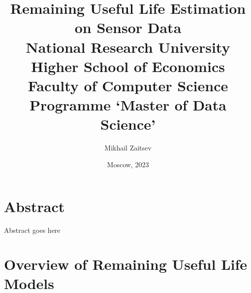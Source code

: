 \documentclass[12pt,a4paper]{report}
\begin{document}
\title{
{Remaining Useful Life Estimation on Sensor Data}\\
{\large National Research University Higher School of Economics}\\
{\large Faculty of Computer Science}\\
{\large Programme ‘Master of Data Science’}\\
}
\author{Mikhail Zaitsev}
\date{Moscow, 2023}
\maketitle


\chapter*{Abstract}
Abstract goes here
\tableofcontents

\chapter{Overview of Remaining Useful Life Models}

\printbibliography[
heading=bibintoc,
title={References}
]
\end{document}
